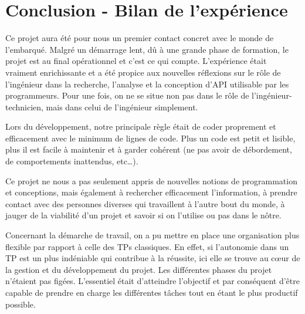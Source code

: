 \chapter[Conclusion]{Conclusion - Bilan de l’expérience} \label{chap:conclusion}

Ce projet aura été pour nous un premier contact concret avec le monde de l’embarqué. Malgré un démarrage lent, dû à une grande phase de formation, 
le projet est au final opérationnel et c’est ce qui compte. L’expérience était vraiment enrichissante et a été propice aux nouvelles réflexions sur 
le rôle de l’ingénieur dans la recherche, l'analyse et la conception d’API utilisable par les programmeurs. Pour une fois, on ne se situe non
 pas dans le rôle de l’ingénieur-technicien, mais dans celui de l’ingénieur simplement.

Lors du développement, notre principale règle était de coder proprement et efficacement avec le minimum de lignes de code. 
Plus un code est petit et lisible, plus il est facile à maintenir et à garder cohérent (ne pas avoir de débordement, 
de comportements inattendus, etc\ldots).

Ce projet ne nous a pas seulement appris de nouvelles notions de programmation et conceptions, mais également à 
rechercher efficacement l’information, à prendre contact avec des personnes diverses qui travaillent à l’autre bout du monde, 
à jauger de la viabilité d’un projet et savoir si on l’utilise ou pas dans le nôtre.

Concernant la démarche de travail, on a pu mettre en place une organisation plus flexible par rapport à celle des TPs classiques. 
En effet, si l'autonomie dans un TP est un plus indéniable qui contribue à la réussite, ici elle se trouve au cœur de 
la gestion et du développement du projet. Les différentes phases du projet n'étaient pas figées. L'essentiel était d'atteindre 
l'objectif et par conséquent d’être capable de prendre en  charge les différentes tâches tout en étant le plus productif possible.  

